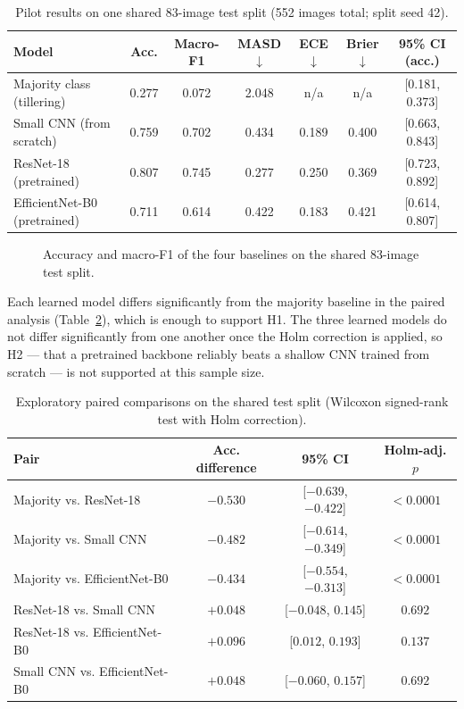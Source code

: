 \documentclass{llncs}
\begin{document}
\begin{table}[t]
\centering
\caption{Pilot results on one shared 83-image test split (552 images total; split seed 42).}
\label{tab:results}
\small
\begin{tabular}{lcccccc}
\toprule
\textbf{Model} & \textbf{Acc.} & \textbf{Macro-F1} & \textbf{MASD}$\downarrow$ & \textbf{ECE}$\downarrow$ & \textbf{Brier}$\downarrow$ & \textbf{95\% CI (acc.)} \\
\midrule
Majority class (tillering)     & 0.277 & 0.072 & 2.048 & n/a   & n/a   & [0.181, 0.373] \\
Small CNN (from scratch)       & 0.759 & 0.702 & 0.434 & 0.189 & 0.400 & [0.663, 0.843] \\
ResNet-18 (pretrained)         & 0.807 & 0.745 & 0.277 & 0.250 & 0.369 & [0.723, 0.892] \\
EfficientNet-B0 (pretrained)   & 0.711 & 0.614 & 0.422 & 0.183 & 0.421 & [0.614, 0.807] \\
\bottomrule
\end{tabular}
\end{table}

\begin{figure}[t]
\centering
\resizebox{0.8\textwidth}{!}{}
\caption{Accuracy and macro-F1 of the four baselines on the shared 83-image test split.}
\label{fig:benchmark}
\end{figure}

Each learned model differs significantly from the majority baseline in the paired analysis (Table~\ref{tab:paired}), which is enough to support H1. The three learned models do not differ significantly from one another once the Holm correction is applied, so H2 — that a pretrained backbone reliably beats a shallow CNN trained from scratch — is not supported at this sample size.

\begin{table}[t]
\centering
\caption{Exploratory paired comparisons on the shared test split (Wilcoxon signed-rank test with Holm correction).}
\label{tab:paired}
\small
\begin{tabular}{lccc}
\toprule
\textbf{Pair} & \textbf{Acc. difference} & \textbf{95\% CI} & \textbf{Holm-adj. $p$} \\
\midrule
Majority vs. ResNet-18          & $-0.530$ & [$-0.639$, $-0.422$] & $<0.0001$ \\
Majority vs. Small CNN          & $-0.482$ & [$-0.614$, $-0.349$] & $<0.0001$ \\
Majority vs. EfficientNet-B0    & $-0.434$ & [$-0.554$, $-0.313$] & $<0.0001$ \\
ResNet-18 vs. Small CNN         & $+0.048$ & [$-0.048$, $0.145$]  & $0.692$ \\
ResNet-18 vs. EfficientNet-B0   & $+0.096$ & [$0.012$, $0.193$]   & $0.137$ \\
Small CNN vs. EfficientNet-B0   & $+0.048$ & [$-0.060$, $0.157$]  & $0.692$ \\
\bottomrule
\end{tabular}
\end{table}
\end{document}
